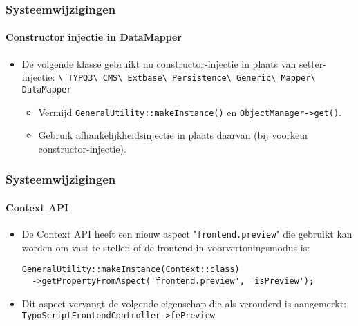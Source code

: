 \begin{frame}[fragile]
	\frametitle{Systeemwijzigingen}
	\framesubtitle{Constructor injectie in DataMapper}

	\begin{itemize}

		\item De volgende klasse gebruikt nu constructor-injectie in plaats van setter-injectie:
			\smaller
				\texttt{\textbackslash
					TYPO3\textbackslash
					CMS\textbackslash
					Extbase\textbackslash
					Persistence\textbackslash
					Generic\textbackslash
					Mapper\textbackslash
					DataMapper}
			\normalsize

			\begin{itemize}\smaller
				\item[\ding{228}] Vermijd \texttt{GeneralUtility::makeInstance()} en \texttt{ObjectManager->get()}.
				\item[\ding{228}] Gebruik afhankelijkheidsinjectie in plaats daarvan (bij voorkeur constructor-injectie).
			\end{itemize}\normalsize

	\end{itemize}

\end{frame}


\begin{frame}[fragile]
	\frametitle{Systeemwijzigingen}
	\framesubtitle{Context API}

	\lstset{basicstyle=\tiny\ttfamily}

	\begin{itemize}

		\item De Context API heeft een nieuw aspect "\texttt{frontend.preview}"
			die gebruikt kan worden om vast te stellen of de frontend in voorvertoningsmodus is:
\begin{lstlisting}
GeneralUtility::makeInstance(Context::class)
  ->getPropertyFromAspect('frontend.preview', 'isPreview');
\end{lstlisting}

		\item Dit aspect vervangt de volgende eigenschap die als verouderd is aangemerkt:
			\small\texttt{TypoScriptFrontendController->fePreview}\normalsize

	\end{itemize}

\end{frame}

